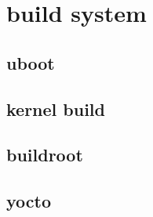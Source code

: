 \part{build system}


\chapter{uboot}


\chapter{kernel build }


\chapter{buildroot}


\chapter{yocto}
